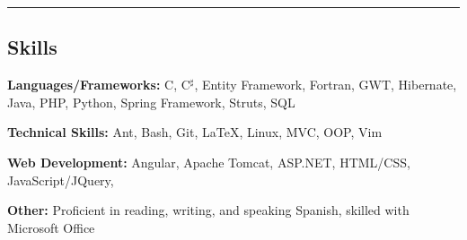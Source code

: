 \documentclass[11pt,letterpaper]{article}
\newenvironment{shortlist}
{\setlength{\linewidth}{0.9\linewidth}
\begin{itemize}
}
{\end{itemize}}
\begin{document}
\begin{itemize}
\begin{shortlist}
	\end{shortlist}

\end{itemize}

\hrule
\vspace{-0.4em}
\subsection*{Skills}

\begin{itemize*}
    \item[]
    \textbf{Languages/Frameworks: } C, C$^\sharp$, Entity Framework, Fortran, GWT, Hibernate, Java, PHP, Python, Spring Framework, Struts, SQL
    \vspace{0.2em}

    \item[]
    \textbf{Technical Skills: } Ant, Bash, Git, \LaTeX, Linux, MVC, OOP, Vim

    \vspace{0.2em}

    \item[]
    \textbf{Web Development: } Angular, Apache Tomcat, ASP.NET, HTML/CSS, JavaScript/JQuery,
    \vspace{0.2em}

    \item[]
    \textbf{Other: } Proficient in reading, writing, and speaking Spanish, skilled with Microsoft Office

\end{itemize*}
\end{document}
